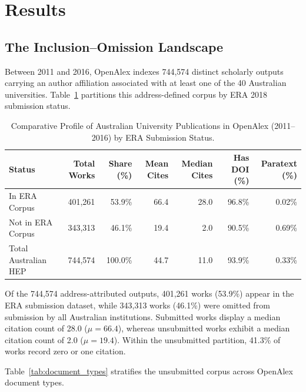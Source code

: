 \section{Results}\label{sec:results}

\subsection{The Inclusion--Omission Landscape}

Between 2011 and 2016, OpenAlex indexes 744,574 distinct scholarly outputs carrying an author affiliation associated with at least one of the 40 Australian universities. Table~\ref{tab:inclusion_landscape} partitions this address-defined corpus by ERA 2018 submission status.

\begin{table}[htbp]
\centering
\caption{Comparative Profile of Australian University Publications in OpenAlex (2011--2016) by ERA Submission Status.}
\label{tab:inclusion_landscape}
\begin{tabular*}{\textwidth}{@{\extracolsep{\fill}}lrrrrrr@{}}
\toprule
Status & Total Works & Share (\%) & Mean Cites & Median Cites & Has DOI (\%) & Paratext (\%) \\
\midrule
In ERA Corpus       & 401,261 & 53.9\% & 66.4 & 28.0 & 96.8\% & 0.02\% \\
Not in ERA Corpus   & 343,313 & 46.1\% & 19.4 &  2.0 & 90.5\% & 0.69\% \\
\midrule
Total Australian HEP & 744,574 & 100.0\% & 44.7 & 11.0 & 93.9\% & 0.33\% \\
\bottomrule
\end{tabular*}
\end{table}

Of the 744,574 address-attributed outputs, 401,261 works (53.9\%) appear in the ERA submission dataset, while 343,313 works (46.1\%) were omitted from submission by all Australian institutions. Submitted works display a median citation count of 28.0 ($\mu = 66.4$), whereas unsubmitted works exhibit a median citation count of 2.0 ($\mu = 19.4$). Within the unsubmitted partition, 41.3\% of works record zero or one citation.

Table~\ref{tab:document_types} stratifies the unsubmitted corpus across OpenAlex document types.

